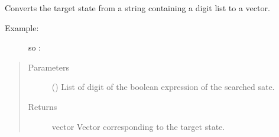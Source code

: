 \documentclass[letterpaper,10pt,english]{sphinxmanual}
\begin{document}
\begin{fulllineitems}
\label{\detokenize{grover:grover.target_state_ket_string_to_vector}}
Converts the target state from a string containing a digit list to a vector.
\begin{description}
\item[{Example:}] \leavevmode
{} so :

%
\begin{sphinxVerbatim}[commandchars=\\\{\},formatcom=\footnotesize]
\end{sphinxVerbatim}

\end{description}
\begin{quote}\begin{description}
\item[{Parameters}] \leavevmode
{} () \textendash{} List of digit of the boolean expression of the 
searched sate.

\item[{Returns}] \leavevmode
vector \textendash{} Vector corresponding to the target state.

\end{description}\end{quote}

\end{fulllineitems}

\end{document}

